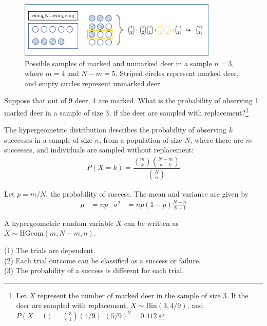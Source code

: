 \begin{figure}[h!]
	\centering
	\includegraphics[width=0.850\textwidth]
	{ch_distributions_oi_biostat/figures/hGeomSchematic/hGeomSchematic.png}
	\caption{Possible samples of marked and unmarked deer in a sample $n = 3$, where $m = 4$ and $N - m = 5$. Striped circles represent marked deer, and empty circles represent unmarked deer.}
	\label{hGeomSchematic}
\end{figure}

\begin{exercise} Suppose that out of 9 deer, 4 are marked. What is the probability of observing 1 marked deer in a sample of size 3, if the deer are sampled with replacement?\footnote{Let $X$ represent the number of marked deer in the sample of size 3. If the deer are sampled with replacement, $X \sim \textrm{Bin}(3, 4/9)$, and $P(X = 1) = { 3 \choose 1 } (4/9)^1 (5/9)^2 = 0.412$.}
\end{exercise}

\begin{termBox}{
		The hypergeometric distribution describes the probability of observing $k$ successes in a sample of size $n$, from a population of size $N$, where there are $m$ successes, and individuals are sampled without replacement:
		\begin{align*}
		P(X = k) = \dfrac{{m \choose k} {N - m \choose n-k}}{{N \choose n}}
		\label{hypergeometricEquation}
		\end{align*}
		
		Let $p = m/N$, the probability of success. The mean and variance are given by\vspace{-2.5mm}
		\begin{align*}
		\mu &= np
		&\sigma^2&=np(1-p)\frac{N-n}{N-1}
		\end{align*}
		
		A hypergeometric random variable $X$ can be written as $X \sim \textrm{HGeom}(m, N-m, n)$.
	}
\end{termBox}

\begin{tipBox}{
		(1) The trials are dependent. \\
		(2) Each trial outcome can be classified as a success or failure. \\
		(3) The probability of a success is different for each trial. \\}
\end{tipBox}

